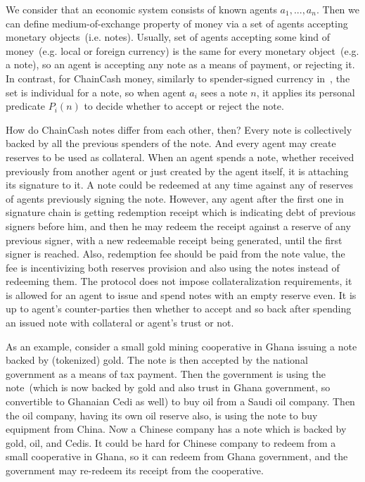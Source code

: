 \documentclass{ifcolog}
\newcommand{\cc}{ChainCash}
\begin{document}
We consider that an economic system consists of known agents $a_1, ..., a_n$. Then we can define medium-of-exchange property of money via a set of agents accepting monetary objects~(i.e. notes). Usually, set of agents accepting some kind of money~(e.g. local or foreign currency) is the same for every monetary object~(e.g. a note), so an agent is accepting any note as a means of payment, or rejecting it. In contrast, for \cc{} money, similarly to spender-signed currency in~\cite{saito2003peer}, the set is individual for a note, so when agent $a_i$ sees a note $n$, it applies its personal predicate $P_i(n)$ to decide whether to accept or reject the note.

How do \cc{} notes differ from each other, then? Every note is collectively backed by all the previous spenders of the note. And every agent may create reserves to be used as collateral. When an agent spends a note, whether received previously from another agent or just created by the agent itself, it is attaching its signature to it. A note could be redeemed at any time against any of reserves of agents previously signing the note. However, any agent after the first one in signature chain is getting redemption receipt which is indicating debt of previous signers before him, and then he may redeem the receipt against a reserve of any previous signer, with a new redeemable receipt being generated, until the first signer is reached. Also, redemption fee should be paid from the note value, the fee is incentivizing both reserves provision and also using the notes instead of redeeming them. The protocol does not impose collateralization requirements, it is allowed for an agent to issue and spend notes with an empty reserve even. It is up to agent's counter-parties then whether to accept and so back after spending an issued note with collateral or agent's trust or not.

As an example, consider a small gold mining cooperative in Ghana issuing a note backed by (tokenized) gold. The note is then accepted by the national government as a means of tax payment. Then the government is using the note~(which is now backed by gold and also trust in Ghana government, so convertible to Ghanaian Cedi as well) to buy oil from a Saudi oil company. Then the oil company, having its own oil reserve also, is using the note to buy equipment from China. Now a Chinese company has a note which is backed by gold, oil, and Cedis. It could be hard for Chinese company to redeem from a small cooperative in Ghana, so it can redeem from Ghana government, and the government may re-redeem its receipt from the cooperative.
\end{document}

